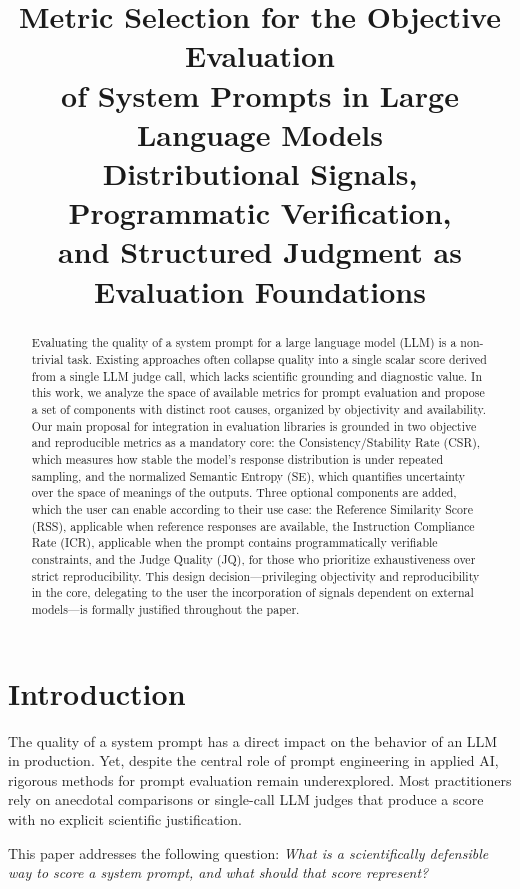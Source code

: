 \documentclass[11pt,a4paper]{article}
\title{
    \vspace{-1cm}
    \textbf{Metric Selection for the Objective Evaluation\\
    of System Prompts in Large Language Models}\\
    \vspace{0.4cm}
    \large Distributional Signals, Programmatic Verification,\\
    and Structured Judgment as Evaluation Foundations
}
\author{
}
\date{}
\begin{document}
\maketitle

\begin{abstract}
Evaluating the quality of a system prompt for a large language model (LLM) is a non-trivial task. Existing approaches often collapse quality into a single scalar score derived from a single LLM judge call, which lacks scientific grounding and diagnostic value. In this work, we analyze the space of available metrics for prompt evaluation and propose a set of components with distinct root causes, organized by objectivity and availability. Our main proposal for integration in evaluation libraries is grounded in two objective and reproducible metrics as a mandatory core: the Consistency/Stability Rate (CSR), which measures how stable the model's response distribution is under repeated sampling, and the normalized Semantic Entropy (SE), which quantifies uncertainty over the space of meanings of the outputs. Three optional components are added, which the user can enable according to their use case: the Reference Similarity Score (RSS), applicable when reference responses are available, the Instruction Compliance Rate (ICR), applicable when the prompt contains programmatically verifiable constraints, and the Judge Quality (JQ), for those who prioritize exhaustiveness over strict reproducibility. This design decision—privileging objectivity and reproducibility in the core, delegating to the user the incorporation of signals dependent on external models—is formally justified throughout the paper.
\end{abstract}

\section{Introduction}

The quality of a system prompt has a direct impact on the behavior of an LLM in production. Yet, despite the central role of prompt engineering in applied AI, rigorous methods for prompt evaluation remain underexplored. Most practitioners rely on anecdotal comparisons or single-call LLM judges that produce a score with no explicit scientific justification.

This paper addresses the following question: \textit{What is a scientifically defensible way to score a system prompt, and what should that score represent?}
\end{document}
